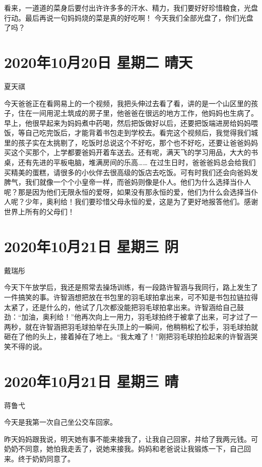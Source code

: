 看来，一道道的菜身后要付出许许多多的汗水、精力，我们要好好珍惜粮食，光盘行动。最后再说一句妈妈烧的菜是真的好吃啊！
今天我们全部光盘了，你们光盘了吗？

\section{2020年10月20日 星期二 晴天}

夏天祺

今天爸爸正在看网易上的一个视频，我把头伸过去看了看，讲的是一个山区里的孩子，住在一间用泥土筑成的房子里，他爸爸在很远的地方工作，他妈妈也生病了。早上，他很早起来为妈妈煮中药喝，然后把饭做好以后，还要把饭端进房给妈妈喂饭，等自己吃完饭后，才能背着书包走到学校去。看完这个视频后，我觉得我们城里的孩子实在太挑剔了，吃饭时总说这个不好吃，那个也不好吃，还要让爸爸妈妈买这个买那个，上学都要爸妈开着车送去。还有呢，满天飞的学习用品，大大的书桌，还有先进的平板电脑，堆满房间的乐高…… 在过生日时，爸爸爸妈总会给我们买精美的蛋糕，请很多的小伙伴去很高级的饭店去吃饭。可有时我们还会向爸妈发脾气，我们就像一个个小皇帝一样，而爸妈则像是仆人。他们为什么选择当仆人呢？那是因为他们无限永恒的爱呀，如果没有那永恒的爱，他们为什么会选择当仆人呢？少年，奥利给！我们要珍惜父母永恒的爱，这是为了更好地报答他们。感谢世界上所有的父母们！

\section{2020年10月21日 星期三 阴}

戴瑞彤

今天下午放学后，我还是照常去操场训练，有一段路许智涵与我同行，路上发生了一件搞笑的事。许智涵想把放在书包里的羽毛球拍拿出来，可不知是书包拉链拉得太紧了，还是什么的，他试了几次都没能把羽毛球拍拿出来。许智涵给自己鼓劲：“加油，奥利给！”他再次向上一用力，羽毛球拍终于被拿了出来，可才过了一两秒，就在许智涵把羽毛球拍举在头顶上的一瞬间，他稍稍松了松手，羽毛球拍就砸在了他的头上，接着掉在了地上。“我太难了！”刚把羽毛球拍捡起来的许智涵哭笑不得的说。

\section{2020年10月21日 星期三 晴}

蒋鲁弋

今天是我第一次自己坐公交车回家。

昨天妈妈跟我说，明天她有事不能来接我了，让我自己回家，并给了我两元钱。可奶奶不同意，她怕我走丢了，说她来接我。妈妈和老爸说让我锻炼一下，自己回来。终于奶奶同意了。

